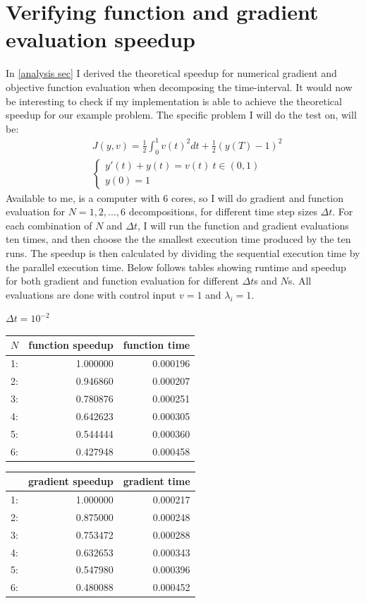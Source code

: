 \section{Verifying function and gradient evaluation speedup} \label{ver S sec}
In \ref{analysis sec} I derived the theoretical speedup for numerical gradient and objective function evaluation when decomposing the time-interval. It would now be interesting to check if my implementation is able to achieve the theoretical speedup for our example problem. The specific problem I will do the test on, will be:
\begin{align*}
&J(y,v) = \frac{1}{2}\int_0^1v(t)^2dt + \frac{1}{2}(y(T)-1)^2 \\
&\left\{
     \begin{array}{lr}
       	y'(t)+y(t) = v(t) \ t\in(0,1)\\
       	y(0)=1
     \end{array}
   \right. 
\end{align*}
Available to me, is a computer with 6 cores, so I will do gradient and function evaluation for $N=1,2,...,6$ decompositions, for different time step sizes $\Delta t$. For each combination of $N$ and $\Delta t$, I will run the function and gradient evaluations ten times, and then choose the the smallest execution time produced by the ten runs. The speedup is then calculated by dividing the sequential execution time by the parallel execution time. Below follows tables showing runtime and speedup for both gradient and function evaluation for different $\Delta t$s and $N$s. All evaluations are done with control input $v=1$ and $\lambda_i=1$.  
\\
\begin{center}
$\Delta t=10^{-2}$\\
\begin{tabular}{lrr}
\toprule
{} $N$&   function speedup &      function time \\
\midrule
1: &  1.000000 &  0.000196 \\
2: &  0.946860 &  0.000207 \\
3: &  0.780876 &  0.000251 \\
4: &  0.642623 &  0.000305 \\
5: &  0.544444 &  0.000360 \\
6: &  0.427948 &  0.000458 \\
\bottomrule
\end{tabular}
\begin{tabular}{lrr}
\toprule
{} &  gradient speedup &     gradient time \\
\midrule
1: &  1.000000 &  0.000217 \\
2: &  0.875000 &  0.000248 \\
3: &  0.753472 &  0.000288 \\
4: &  0.632653 &  0.000343 \\
5: &  0.547980 &  0.000396 \\
6: &  0.480088 &  0.000452 \\
\bottomrule
\end{tabular}
\end{center}
